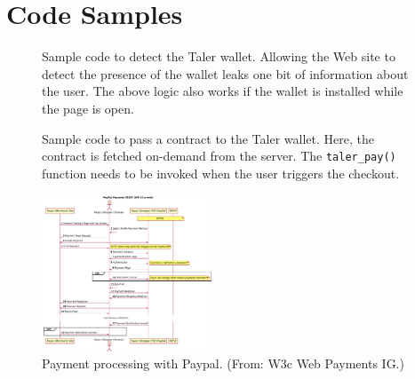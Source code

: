 \documentclass{IEEEtran}
\begin{document}
\section{Code Samples}

{}

\begin{figure}[h!]
 \lstset{language=JavaScript}
 
 \caption{Sample code to detect the Taler wallet. Allowing the
  Web site to detect the presence of the wallet leaks one bit
  of information about the user. The above logic also works
  if the wallet is installed while the page is open.}
  \label{listing:presence}
\end{figure}


\begin{figure}[h!]
 \lstset{language=JavaScript}
 
 \caption{Sample code to pass a contract to the Taler wallet.
          Here, the contract is fetched on-demand from the server.
          The {\tt taler\_pay()} function needs to be invoked
          when the user triggers the checkout.}
 \label{listing:contract}
\end{figure}


\begin{figure}[b!]
\includegraphics[width=0.45\textwidth]{figs/paypal.pdf}
\caption{Payment processing with Paypal. (From: W3c Web Payments IG.)}
\label{fig:paypal}
\end{figure}
\end{document}
